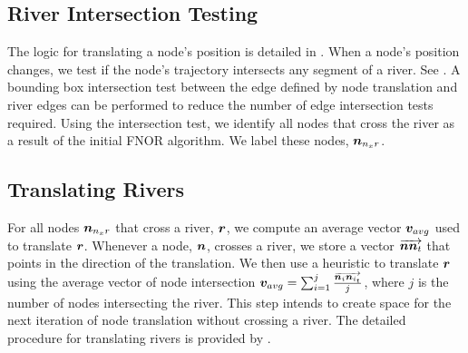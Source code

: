\subsection{River Intersection Testing}

The logic for translating a node's position is detailed in . When a node's position changes, we test if the node's trajectory intersects any segment of a river. See . A bounding box intersection test between the edge defined by node translation and river edges can be performed to reduce the number of edge intersection tests required. Using the intersection test, we identify all nodes that cross the river as a result of the initial FNOR algorithm. We label these nodes, $ \bm{n}_{n_{x}r} $.

\subsection{Translating Rivers}

For all nodes $ \bm{n}_{n_{x}r} $ that cross a river, $ \bm{r} $, we compute an average vector $ \bm{v}_{avg} $ used to translate $ \bm{r} $. Whenever a node, $ \bm{n} $, crosses a river, we store a vector $ \protect\overrightarrow{\bm{n}\bm{n}_{t}} $ that points in the direction of the translation. We then use a heuristic to translate $ \bm{r} $ using the average vector of node intersection $ \bm{v}_{avg} = \sum_{i=1}^j \frac{\protect\overrightarrow{\bm{n}_i\bm{n}_{i_t}}}{j} $, where $ j $ is the number of nodes intersecting the river. This step intends to create space for the next iteration of node translation without crossing a river. The detailed procedure for translating rivers is provided by .


